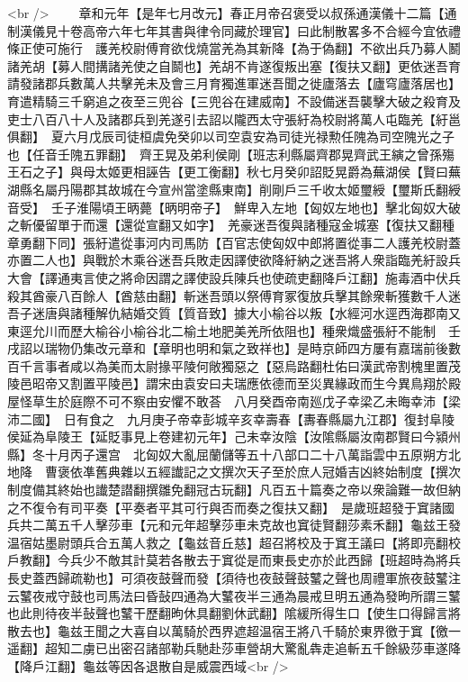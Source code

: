 <br />
　　章和元年【是年七月改元】春正月帝召褒受以叔孫通漢儀十二篇【通制漢儀見十卷高帝六年七年其書與律令同藏於理官】曰此制散畧多不合經今宜依禮條正使可施行　護羌校尉傅育欲伐燒當羌為其新降【為于偽翻】不欲出兵乃募人鬭諸羌胡【募人間搆諸羌使之自鬬也】羌胡不肯遂復叛出塞【復扶又翻】更依迷吾育請發諸郡兵數萬人共擊羌未及會三月育獨進軍迷吾聞之徙廬落去【廬穹廬落居也】育遣精騎三千窮追之夜至三兜谷【三兜谷在建威南】不設備迷吾襲擊大破之殺育及吏士八百八十人及諸郡兵到羌遂引去詔以隴西太守張紆為校尉將萬人屯臨羌【紆邕俱翻】　夏六月戊辰司徒桓虞免癸卯以司空袁安為司徒光禄勲任隗為司空隗光之子也【任音壬隗五罪翻】　齊王晃及弟利侯剛【班志利縣屬齊郡晃齊武王縯之曾孫殤王石之子】與母太姬更相誣告【更工衡翻】秋七月癸卯詔貶晃爵為蕪湖侯【賢曰蕪湖縣名屬丹陽郡其故城在今宣州當塗縣東南】削剛戶三千收太姬璽綬【璽斯氏翻綬音受】　壬子淮陽頃王昞薨【昞明帝子】　鮮卑入左地【匈奴左地也】擊北匈奴大破之斬優留單于而還【還從宣翻又如字】　羌豪迷吾復與諸種寇金城塞【復扶又翻種章勇翻下同】張紆遣從事河内司馬防【百官志使匈奴中郎將置從事二人護羌校尉蓋亦置二人也】與戰於木乘谷迷吾兵敗走因譯使欲降紆納之迷吾將人衆詣臨羌紆設兵大會【譯通夷言使之將命因謂之譯使設兵陳兵也使疏吏翻降戶江翻】施毒酒中伏兵殺其酋豪八百餘人【酋慈由翻】斬迷吾頭以祭傅育冢復放兵擊其餘衆斬獲數千人迷吾子迷唐與諸種解仇結婚交質【質音致】據大小榆谷以叛【水經河水逕西海郡南又東逕允川而歷大榆谷小榆谷北二榆土地肥美羌所依阻也】種衆熾盛張紆不能制　壬戌詔以瑞物仍集改元章和【章明也明和氣之致祥也】是時京師四方屢有嘉瑞前後數百千言事者咸以為美而太尉掾平陵何敞獨惡之【惡烏路翻杜佑曰漢武帝割槐里置茂陵邑昭帝又割置平陵邑】謂宋由袁安曰夫瑞應依德而至災異緣政而生今異鳥翔於殿屋怪草生於庭際不可不察由安懼不敢荅　八月癸酉帝南廵戊子幸梁乙未晦幸沛【梁沛二國】　日有食之　九月庚子帝幸彭城辛亥幸壽春【夀春縣屬九江郡】復封阜陵侯延為阜陵王【延貶事見上卷建初元年】己未幸汝陰【汝隂縣屬汝南郡賢曰今潁州縣】冬十月丙子還宫　北匈奴大亂屈蘭儲等五十八部口二十八萬詣雲中五原朔方北地降　曹褒依凖舊典雜以五經䜟記之文撰次天子至於庶人冠婚吉凶終始制度【撰次制度備其終始也䜟楚譛翻撰雛免翻冠古玩翻】凡百五十篇奏之帝以衆論難一故但納之不復令有司平奏【平奏者平其可行與否而奏之復扶又翻】　是歲班超發于窴諸國兵共二萬五千人擊莎車【元和元年超擊莎車未克故也窴徒賢翻莎素禾翻】龜兹王發温宿姑墨尉頭兵合五萬人救之【龜兹音丘慈】超召將校及于窴王議曰【將即亮翻校戶教翻】今兵少不敵其計莫若各散去于窴從是而東長史亦於此西歸【班超時為將兵長史蓋西歸疏勒也】可須夜鼓聲而發【須待也夜鼓聲鼓鼜之聲也周禮軍旅夜鼓鼜注云鼜夜戒守鼓也司馬法曰昏鼔四通為大鼜夜半三通為晨戒旦明五通為發昫所謂三鼜也此則待夜半鼔聲也鼜干歷翻昫休具翻劉休武翻】隂緩所得生口【使生口得歸言將散去也】龜兹王聞之大喜自以萬騎於西界遮超温宿王將八千騎於東界徼于窴【徼一遥翻】超知二虜已出密召諸部勒兵馳赴莎車營胡大驚亂犇走追斬五千餘級莎車遂降【降戶江翻】龜兹等因各退散自是威震西域<br />
